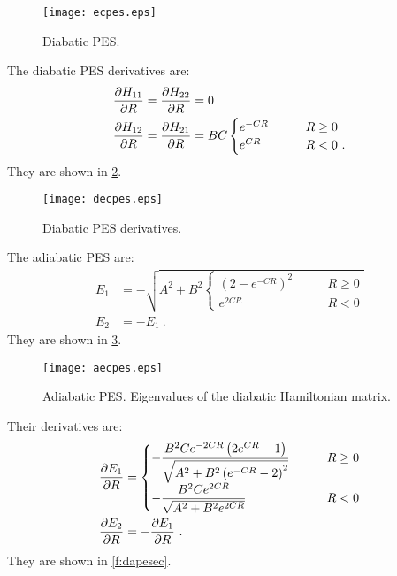 \begin{figure}
\centering
\texttt{[image: ecpes.eps]}
\caption[Extended coupling: diabatic PES.]{Diabatic PES.}
\label{f:pesec}
\end{figure}

The diabatic PES derivatives are:
\begin{subequations}
\begin{align}
\frac{\partial H_{11}}{\partial R} &= \frac{\partial H_{22}}{\partial R} = 0\\
\frac{\partial H_{12}}{\partial R} &= \frac{\partial H_{21}}{\partial R} = 
B C\begin{cases}
e^{-C R} &\qquad R \geq 0\\
e^{C R} &\qquad R<0~.
\end{cases}
\end{align}
\end{subequations}
They are shown in \cref{f:dpesec}.

\begin{figure}
\centering
\texttt{[image: decpes.eps]}
\caption[Extended coupling: diabatic PES derivatives.]{Diabatic PES derivatives.}
\label{f:dpesec}
\end{figure}

The adiabatic PES are:
\begin{subequations}
\begin{align}
E_{1} & = -\sqrt{A^{2} 
+ B^{2}\begin{cases}
(2 - e^{-C R})^{2} &\qquad R \geq 0\\
e^{2C R} &\qquad R<0
\end{cases}
}\\
E_{2} &= -E_{1}~.
\end{align}
\end{subequations}
They are shown in \cref{f:apesec}.

\begin{figure}
\centering
\texttt{[image: aecpes.eps]}
\caption[Extended coupling: adiabatic PES.]{Adiabatic PES. Eigenvalues of the diabatic Hamiltonian matrix.}
\label{f:apesec}
\end{figure}

Their derivatives are:
\begin{subequations}
\begin{align}
\frac{\partial E_{1}}{\partial R} &=
\begin{cases}
-\dfrac{B^2 C e^{-2 C R} \left(2 e^{C R}-1\right)}{\sqrt{A^2+B^2 \left(e^{-C R}-2\right)^2}} & \qquad R \geq 0\\
-\dfrac{B^2 C e^{2 C R}}{\sqrt{A^2+B^2 e^{2 C R}}} &\qquad R<0
\end{cases}\\
\frac{\partial E_{2}}{\partial R} &= -\frac{\partial E_{1}}{\partial R}~.
\end{align}
\end{subequations}
They are shown in \cref{f:dapesec}.

